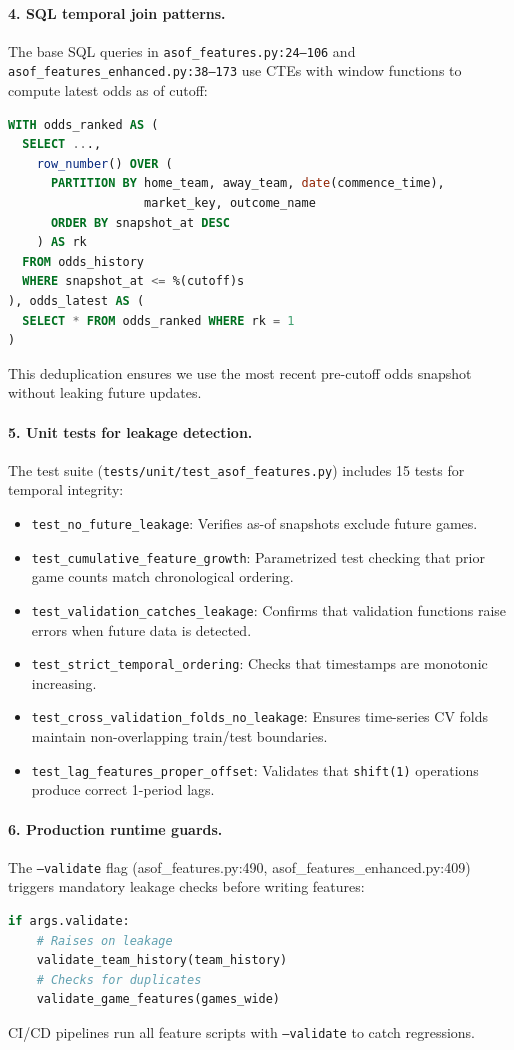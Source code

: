 \paragraph{4. SQL temporal join patterns.}
The base SQL queries in \texttt{asof\_features.py:24--106} and \texttt{asof\_features\_enhanced.py:38--173} use CTEs with window functions to compute latest odds as of cutoff:
\begin{lstlisting}[language=SQL,basicstyle=\ttfamily\footnotesize]
WITH odds_ranked AS (
  SELECT ...,
    row_number() OVER (
      PARTITION BY home_team, away_team, date(commence_time),
                   market_key, outcome_name
      ORDER BY snapshot_at DESC
    ) AS rk
  FROM odds_history
  WHERE snapshot_at <= %(cutoff)s
), odds_latest AS (
  SELECT * FROM odds_ranked WHERE rk = 1
)
\end{lstlisting}
This deduplication ensures we use the most recent pre-cutoff odds snapshot without leaking future updates.

\paragraph{5. Unit tests for leakage detection.}
The test suite (\texttt{tests/unit/test\_asof\_features.py}) includes 15 tests for temporal integrity:
\begin{itemize}
  \item \texttt{test\_no\_future\_leakage}: Verifies as-of snapshots exclude future games.
  \item \texttt{test\_cumulative\_feature\_growth}: Parametrized test checking that prior game counts match chronological ordering.
  \item \texttt{test\_validation\_catches\_leakage}: Confirms that validation functions raise errors when future data is detected.
  \item \texttt{test\_strict\_temporal\_ordering}: Checks that timestamps are monotonic increasing.
  \item \texttt{test\_cross\_validation\_folds\_no\_leakage}: Ensures time-series CV folds maintain non-overlapping train/test boundaries.
  \item \texttt{test\_lag\_features\_proper\_offset}: Validates that \texttt{shift(1)} operations produce correct 1-period lags.
\end{itemize}

\paragraph{6. Production runtime guards.}
The \texttt{--validate} flag (asof\_features.py:490, asof\_features\_enhanced.py:409) triggers mandatory leakage checks before writing features:
\begin{lstlisting}[language=Python,basicstyle=\ttfamily\scriptsize,breaklines=true,postbreak=\mbox{\textcolor{red}{$\hookrightarrow$}\space}]
if args.validate:
    # Raises on leakage
    validate_team_history(team_history)
    # Checks for duplicates
    validate_game_features(games_wide)
\end{lstlisting}
CI/CD pipelines run all feature scripts with \texttt{--validate} to catch regressions.

